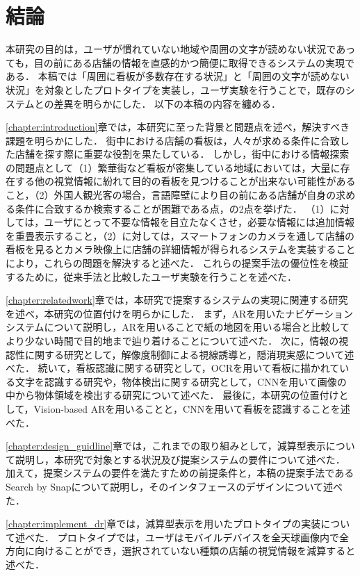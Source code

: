 \chapter{結論}
\label{chapter:conclusion}
  本研究の目的は，ユーザが慣れていない地域や周囲の文字が読めない状況であっても，目の前にある店舗の情報を直感的かつ簡便に取得できるシステムの実現である．
  本稿では「周囲に看板が多数存在する状況」と「周囲の文字が読めない状況」を対象としたプロトタイプを実装し，ユーザ実験を行うことで，既存のシステムとの差異を明らかにした．
  以下の本稿の内容を纏める．

  \ref{chapter:introduction}章では，本研究に至った背景と問題点を述べ，解決すべき課題を明らかにした．
  街中における店舗の看板は，人々が求める条件に合致した店舗を探す際に重要な役割を果たしている．
  しかし，街中における情報探索の問題点として（1）繁華街など看板が密集している地域においては，大量に存在する他の視覚情報に紛れて目的の看板を見つけることが出来ない可能性があること，（2）外国人観光客の場合，言語障壁により目の前にある店舗が自身の求める条件に合致するか検索することが困難である点，の2点を挙げた．
  （1）に対しては，ユーザにとって不要な情報を目立たなくさせ，必要な情報には追加情報を重畳表示すること，（2）に対しては，スマートフォンのカメラを通して店舗の看板を見るとカメラ映像上に店舗の詳細情報が得られるシステムを実装することにより，これらの問題を解決すると述べた．
  これらの提案手法の優位性を検証するために，従来手法と比較したユーザ実験を行うことを述べた．

  \ref{chapter:relatedwork}章では，本研究で提案するシステムの実現に関連する研究を述べ，本研究の位置付けを明らかにした．
  まず，ARを用いたナビゲーションシステムについて説明し，ARを用いることで紙の地図を用いる場合と比較してより少ない時間で目的地まで辿り着けることについて述べた．
  次に，情報の視認性に関する研究として，解像度制御による視線誘導と，隠消現実感について述べた．
  続いて，看板認識に関する研究として，OCRを用いて看板に描かれている文字を認識する研究や，物体検出に関する研究として，CNNを用いて画像の中から物体領域を検出する研究について述べた．
  最後に，本研究の位置付けとして，Vision-based ARを用いることと，CNNを用いて看板を認識することを述べた．

  \ref{chapter:design_guidline}章では，これまでの取り組みとして，減算型表示について説明し，本研究で対象とする状況及び提案システムの要件について述べた．
  加えて，提案システムの要件を満たすための前提条件と，本稿の提案手法であるSearch by Snapについて説明し，そのインタフェースのデザインについて述べた．

  \ref{chapter:implement_dr}章では，減算型表示を用いたプロトタイプの実装について述べた．
  プロトタイプでは，ユーザはモバイルデバイスを全天球画像内で全方向に向けることができ，選択されていない種類の店舗の視覚情報を減算すると述べた．

